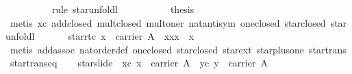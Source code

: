 \begin{isabellebody}
\ \ \ \ \ \ \ \ \isamarkupfalse%
\ {}rule\ star{}unfoldl{}\isanewline
\ \ \ \ \isamarkupfalse%
\isanewline
\ \ \ \ \isamarkupfalse%
\ {}thesis\isanewline
\ \ \ \ \ \ \isamarkupfalse%
\ {}metis\ xc\ add{}closed\ mult{}closed\ mult{}oner\ nat{}antisym\ one{}closed\ star{}closed\ star{}unfoldl{}\isanewline
\ \ \isamarkupfalse%
%
\endisatagproof
{\isafoldproof}%
%
\isadelimproof
\isanewline
%
\endisadelimproof
\isanewline
\ \ \isamarkupfalse%
\ star{}rtc{}{}\ {}x\ {}\ carrier\ A\ {}\ {}{}x{}xx\ {}\ x\isanewline
%
\isadelimproof
\ \ \ \ %
\endisadelimproof
%
\isatagproof
{}\isamarkupfalse%
\ {}metis\ add{}assoc\ nat{}order{}def\ one{}closed\ star{}closed\ star{}ext\ star{}plus{}one\ star{}trans\ star{}trans{}eq{}%
\endisatagproof
{\isafoldproof}%
%
\isadelimproof
\isanewline
%
\endisadelimproof
\isanewline
\ \ \isamarkupfalse%
\ star{}slide{}\ \ xc{}\ {}x\ {}\ carrier\ A{}\ \ yc{}\ {}y\ {}\ carrier\ A{}\isanewline

\end{isabellebody}

